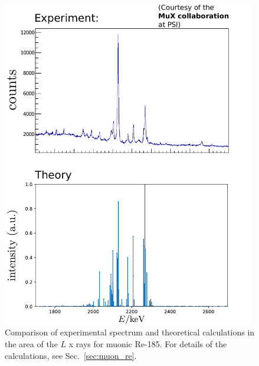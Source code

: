 %
%
\begin{figure}%
\centering
\includegraphics[width=0.99\textwidth]{pics/185Re_L}
\caption{
Comparison of experimental spectrum and theoretical calculations in the area of the $L$ x rays for muonic Re-185. For details of the calculations, see Sec.~\ref{sec:muon_re}.
}
\label{fig:re54_L}
\end{figure}
% 



























\cleardoublepage
